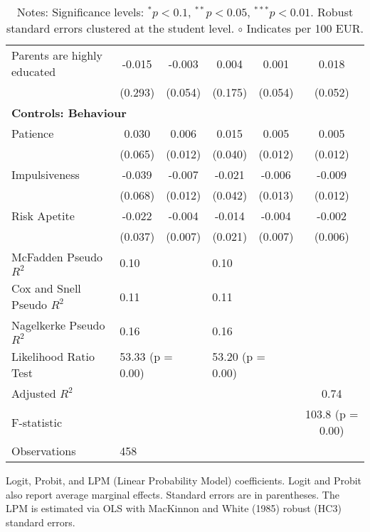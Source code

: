 \begin{table}
\begin{tabular}{lccccc}
Parents are highly educated & -0.015 & -0.003 & 0.004 & 0.001 & 0.018 \\
 & (0.293) & (0.054) & (0.175) & (0.054) & (0.052) \\
\midrule
\multicolumn{6}{l}{\textbf{Controls: Behaviour}} \\
Patience & 0.030 & 0.006 & 0.015 & 0.005 & 0.005 \\
 & (0.065) & (0.012) & (0.040) & (0.012) & (0.012) \\
Impulsiveness & -0.039 & -0.007 & -0.021 & -0.006 & -0.009 \\
 & (0.068) & (0.012) & (0.042) & (0.013) & (0.012) \\
Risk Apetite & -0.022 & -0.004 & -0.014 & -0.004 & -0.002 \\
 & (0.037) & (0.007) & (0.021) & (0.007) & (0.006) \\
\midrule
McFadden Pseudo $R^2$ & \multicolumn{2}{l}{0.10} & \multicolumn{2}{l}{0.10} & \\
Cox and Snell Pseudo $R^2$ & \multicolumn{2}{l}{0.11} & \multicolumn{2}{l}{0.11} & \\
Nagelkerke Pseudo $R^2$ & \multicolumn{2}{l}{0.16} & \multicolumn{2}{l}{0.16} & \\
Likelihood Ratio Test & \multicolumn{2}{l}{53.33 (p = 0.00)} & \multicolumn{2}{l}{53.20 (p = 0.00)} & \\
Adjusted $R^2$ & & & & & 0.74 \\
F-statistic & & & & & 103.8 (p = 0.00) \\
Observations & \multicolumn{5}{l}{458} \\
\bottomrule
\end{tabular}
\caption*{Logit, Probit, and LPM (Linear Probability Model) coefficients. Logit and Probit also report average marginal effects. Standard errors are in parentheses. The LPM is estimated via OLS with MacKinnon and White (1985) robust (HC3) standard errors.}
\label{tab:logit_probit_lpm_results}
\caption*{\small{Notes: Significance levels: $^{{*}} p < 0.1$, $^{{**}} p < 0.05$, $^{{***}} p < 0.01$. Robust standard errors clustered at the student level. $\circ$ Indicates per 100 EUR.}}
\end{table}
